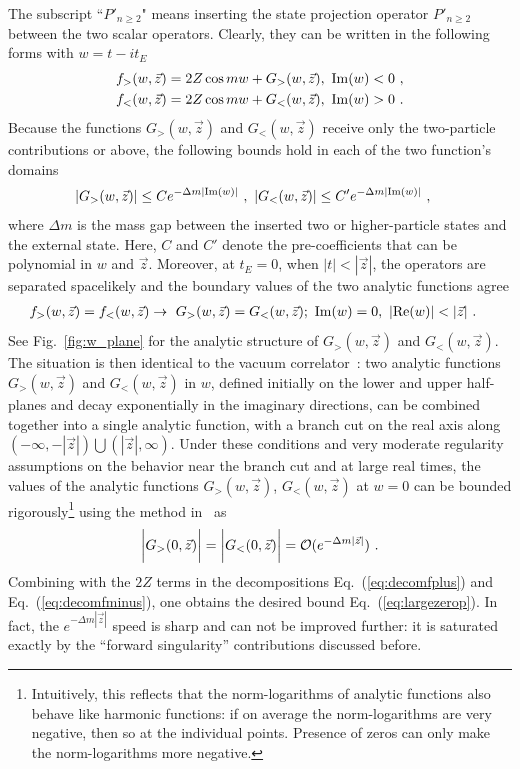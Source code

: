 \documentclass[a4paper,11pt]{article}
\begin{document}
The subscript ``$P'_{n \ge2}$" means inserting the state projection operator $P'_{n \ge2}$ between the two scalar operators. Clearly, they can be written in the following forms with $w=t-it_E$
\begin{align}
&f_>(w,\vec{z})=2Z\cos mw +G_>(w,\vec{z}) , \ {\rm Im}(w)<0 \ , \label{eq:decomfplus}\\
&f_<(w,\vec{z})=2Z\cos mw +G_<(w,\vec{z}), \  {\rm Im}(w)>0 \ .\label{eq:decomfminus}
\end{align}
Because the functions $G_>(w,\vec{z})$ and $G_<(w,\vec{z})$ receive only the two-particle contributions or above, the following bounds hold in each of the two function's domains
\begin{align}\label{eq:boundim}
&|G_>(w,\vec{z})| \le Ce^{-\Delta m|{\rm Im}(w)|} \ ,  \ | G_<(w,\vec{z})| \le C'e^{-\Delta m|{\rm Im}(w)|} \ , 
\end{align}
where $\Delta m$ is the mass gap between the inserted two or higher-particle states and the external state. Here, $C$ and $C'$ denote the pre-coefficients that can be polynomial in $w$ and $\vec{z}$. Moreover, at $t_E=0$, when $|t|<|\vec{z}|$, the operators are separated spacelikely and the boundary values of the two analytic functions agree
\begin{align}
&f_{>}(w,\vec{z})=f_{<}(w,\vec{z}) \rightarrow  \  G_>(w,\vec{z})=G_<(w,\vec{z}); \  {\rm Im}(w)=0,  \  |{\rm Re}(w)|<|\vec{z}| \ .
\end{align}
See Fig.~\ref{fig:w_plane} for the analytic structure of $G_>(w,\vec{z})$ and $G_<(w,\vec{z})$. The situation is then identical to the vacuum correlator~\cite{Fredenhagen:1984bz}: two analytic functions $G_>(w,\vec{z})$ and $G_<(w,\vec{z})$ in $w$, defined initially on the lower and upper half-planes and decay exponentially in the imaginary directions,  can be combined together into a single analytic function, with a branch cut on the real axis along $(-\infty,-|\vec{z}|)\bigcup (|\vec{z}|,\infty)$. Under these conditions and very moderate regularity assumptions on the behavior near the branch cut and at large real times, the values of the analytic functions $G_{>}(w,\vec{z})$,  $G_{<}(w,\vec{z})$ at $w=0$ can be bounded rigorously\footnote{Intuitively, this reflects that the norm-logarithms of analytic functions also behave like harmonic functions: if on average the norm-logarithms are very negative, then so at the individual points. Presence of zeros can only make the norm-logarithms more negative. } using the method in~\cite{Fredenhagen:1984bz} as
\begin{align}\label{eq:Causalitybound}
\bigg|G_>(0,\vec{z})\bigg|=\bigg|G_<(0,\vec{z})\bigg|={\cal O}(e^{-\Delta m|\vec{z}|}) \ . 
\end{align}
Combining with the $2Z$ terms in the decompositions Eq.~(\ref{eq:decomfplus}) and Eq.~(\ref{eq:decomfminus}), one obtains the desired bound Eq.~(\ref{eq:largezerop}). In fact, the $e^{-\Delta m|\vec{z}|}$ speed is sharp and can not be improved further: it is saturated exactly by the ``forward singularity'' contributions discussed before. 
\end{document}
